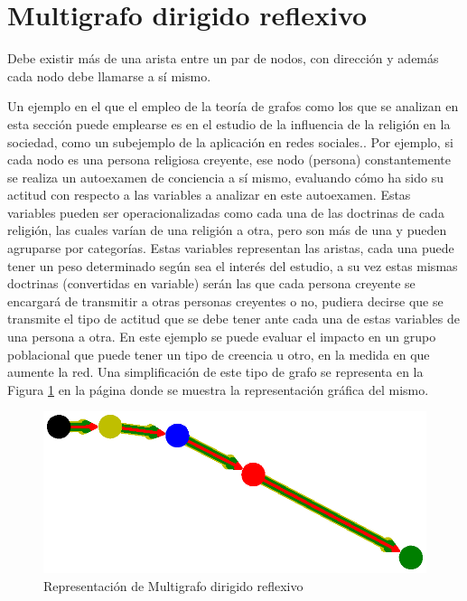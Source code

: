 \documentclass{article}
\begin{document}
\section{Multigrafo dirigido reflexivo}

Debe existir más de una arista entre un par de nodos, con dirección y además cada nodo debe llamarse a sí mismo.

Un ejemplo en el que el empleo de la teoría de grafos como los que se analizan en esta sección puede emplearse es en el estudio de la influencia de la religión en la sociedad, como un subejemplo de la aplicación en redes sociales.\cite{redes}. 
Por ejemplo, si cada nodo es una persona religiosa creyente, ese nodo (persona) constantemente se realiza un autoexamen de conciencia a sí mismo, evaluando cómo ha sido su actitud con respecto a las variables a analizar en este autoexamen. Estas variables pueden ser operacionalizadas como cada una de las doctrinas de cada religión, las cuales varían de una religión a otra, pero son más de una y pueden agruparse por categorías. Estas variables representan las aristas, cada una puede tener un peso determinado según sea el interés del estudio, a su vez estas mismas doctrinas (convertidas en variable) serán las que cada persona creyente se encargará de transmitir a otras personas creyentes o no, pudiera decirse que se transmite el tipo de actitud que se debe tener ante cada una de estas variables de una persona a otra. En este ejemplo se puede evaluar el impacto en un grupo poblacional que puede tener un tipo de creencia u otro, en la medida en que aumente la red. Una simplificación de este tipo de grafo se representa en la Figura \ref{fig:Fig12} en la página \pageref{fig:Fig12} donde se muestra la representación gráfica del mismo.



\begin{figure}
    \centering
    \includegraphics[scale=0.6]{imagenes/Fig12.eps}
    \caption{Representación de Multigrafo dirigido reflexivo}
    \label{fig:Fig12}
\end{figure}




\end{document}
